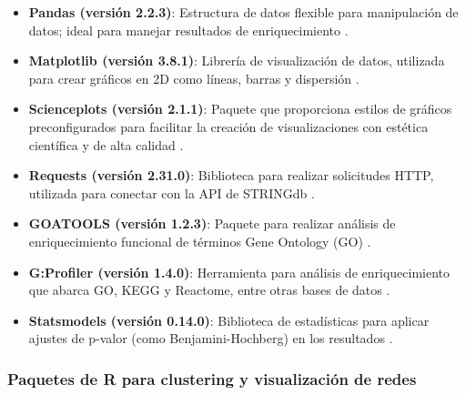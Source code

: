 \begin{itemize}
	\item \textbf{Pandas (versión 2.2.3)}: Estructura de datos flexible para manipulación de datos; ideal para manejar resultados de enriquecimiento \cite{pandas}.
	\item \textbf{Matplotlib (versión 3.8.1)}: Librería de visualización de datos, utilizada para crear gráficos en 2D como líneas, barras y dispersión \cite{matplotlib}.
	\item \textbf{Scienceplots (versión 2.1.1)}: Paquete que proporciona estilos de gráficos preconfigurados para facilitar la creación de visualizaciones con estética científica y de alta calidad \cite{scienceplots}.
	\item \textbf{Requests (versión 2.31.0)}: Biblioteca para realizar solicitudes HTTP, utilizada para conectar con la API de STRINGdb \cite{requests}.
	\item \textbf{GOATOOLS (versión 1.2.3)}: Paquete para realizar análisis de enriquecimiento funcional de términos Gene Ontology (GO) \cite{goatools}.
	\item \textbf{G:Profiler (versión 1.4.0)}: Herramienta para análisis de enriquecimiento que abarca GO, KEGG y Reactome, entre otras bases de datos \cite{gprofiler}.
	\item \textbf{Statsmodels (versión 0.14.0)}: Biblioteca de estadísticas para aplicar ajustes de p-valor (como Benjamini-Hochberg) en los resultados \cite{statsmodels}.
\end{itemize}

\vspace{1cm}

\subsubsection*{Paquetes de R para clustering y visualización de redes}

